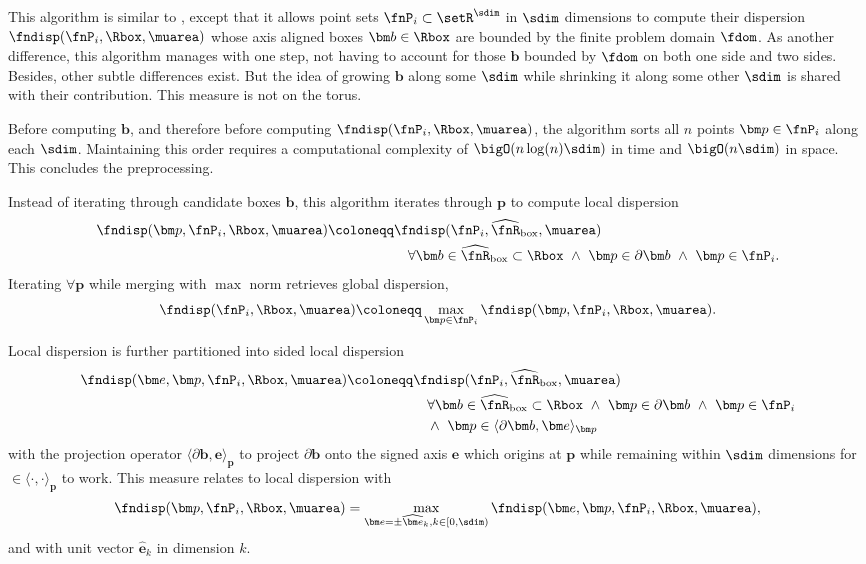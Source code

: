 %
This algorithm is similar to , except that it allows point sets $\fnP_i \subset \setR^{\sdim}$ in $\sdim$ dimensions to compute their dispersion $\fndisp(\fnP_i, \Rbox, \muarea)$ whose axis aligned boxes $\bm b \in \Rbox$ are bounded by the finite problem domain $\fdom$. As another difference, this algorithm manages with one step, not having to account for those $\bm b$ bounded by $\fdom$ on both one side and two sides. Besides, other subtle differences exist. But the idea of growing $\bm b$ along some $\sdim$ while shrinking it along some other $\sdim$ is shared with their contribution. This measure is not on the torus.

Before computing $\bm b$, and therefore before computing $\fndisp(\fnP_i, \Rbox, \muarea)$, the algorithm sorts all $n$ points $\bm p \in \fnP_i$ along each $\sdim$. Maintaining this order requires a computational complexity of $\bigO(n\log(n)\sdim)$ in time and $\bigO(n \sdim)$ in space. This concludes the preprocessing.

Instead of iterating through candidate boxes $\bm b$, this algorithm iterates through $\bm p$ to compute local dispersion
\begin{align*}
  \fndisp(\bm p, \fnP_i, \Rbox, \muarea) \coloneqq &\fndisp(\fnP_i, \widehat\fnR_{\text{box}}, \muarea) \\
  &\quad \forall \bm b \in \widehat\fnR_{\text{box}} \subset \Rbox\ \wedge\ \bm p \in \partial\bm b\ \wedge\ \bm p \in \fnP_i.
\end{align*}
Iterating $\forall \bm p$ while merging with $\max$ norm retrieves global dispersion,
\begin{align*}
  \fndisp(\fnP_i, \Rbox, \muarea) \coloneqq \max_{\bm p \in \fnP_i} \fndisp(\bm p, \fnP_i, \Rbox, \muarea).
\end{align*}

Local dispersion is further partitioned into sided local dispersion
\begin{align*}
  \fndisp(\bm e, \bm p, \fnP_i, \Rbox, \muarea) \coloneqq &\fndisp(\fnP_i, \widehat\fnR_{\text{box}}, \muarea) \\
  &\quad \forall \bm b \in \widehat\fnR_{\text{box}} \subset \Rbox\ \wedge\ \bm p \in \partial\bm b\ \wedge\ \bm p \in \fnP_i \\
  &\quad \wedge\ \bm p \in \langle \partial \bm b, \bm e \rangle_{\bm p}
\end{align*}
with the projection operator $\langle \partial \bm b, \bm e \rangle_{\bm p}$ to  project $\partial\bm b$ onto the signed axis $\bm e$ which origins at $\bm p$ while remaining within $\sdim$ dimensions for $\in \langle \cdot,\cdot\rangle_{\bm p}$ to work. This measure relates to local dispersion with
\begin{align*}
  \fndisp(\bm p, \fnP_i, \Rbox, \muarea) = \max_{\bm e = \pm \widehat{\bm e}_k, k \in [0,\sdim)} \fndisp(\bm e, {\bm p}, \fnP_i, \Rbox, \muarea),
\end{align*}
and with unit vector $\widehat{\bm e}_k$ in dimension $k$.

